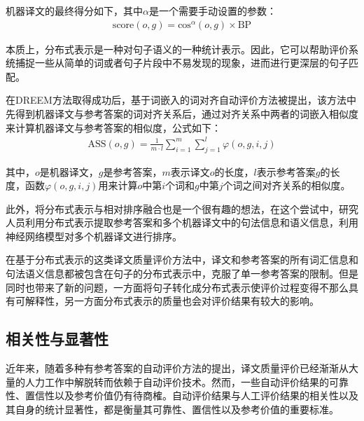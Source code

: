 \parinterval 机器译文的最终得分如下，其中$\alpha$是一个需要手动设置的参数：
\begin{eqnarray}
\textrm{score}(o,g) = \textrm{cos}{^\alpha }(o,g) \times \textrm{BP}
\label{eq:4-18}
\end{eqnarray}

\parinterval 本质上，分布式表示是一种对句子语义的一种统计表示。因此，它可以帮助评价系统捕捉一些从简单的词或者句子片段中不易发现的现象，进而进行更深层的句子匹配。

\parinterval 在DREEM方法取得成功后，基于词嵌入的词对齐自动评价方法被提出，该方法中先得到机器译文与参考答案的词对齐关系后，通过对齐关系中两者的词嵌入相似度来计算机器译文与参考答案的相似度，公式如下：
\begin{eqnarray}
\textrm{ASS}(o,g) = \frac{1}{{m \cdot l}}\sum\limits_{i = 1}^{m} {\sum\limits_{j = 1}^{l} {\varphi (o,g,i,j)} }
\label{eq:4-19}
\end{eqnarray}

\noindent 其中，$o$是机器译文，$g$是参考答案，$m$表示译文$o$的长度，$l$表示参考答案$g$的长度，函数$\varphi(o,g,i,j)$用来计算$o$中第$i$个词和$g$中第$j$个词之间对齐关系的相似度。

\parinterval 此外，将分布式表示与相对排序融合也是一个很有趣的想法，在这个尝试中，研究人员利用分布式表示提取参考答案和多个机器译文中的句法信息和语义信息，利用神经网络模型对多个机器译文进行排序。

\parinterval 在基于分布式表示的这类译文质量评价方法中，译文和参考答案的所有词汇信息和句法语义信息都被包含在句子的分布式表示中，克服了单一参考答案的限制。但是同时也带来了新的问题，一方面将句子转化成分布式表示使评价过程变得不那么具有可解释性，另一方面分布式表示的质量也会对评价结果有较大的影响。


\subsection{相关性与显著性}

\parinterval 近年来，随着多种有参考答案的自动评价方法的提出，译文质量评价已经渐渐从大量的人力工作中解脱转而依赖于自动评价技术。然而，一些自动评价结果的可靠性、置信性以及参考价值仍有待商榷。自动评价结果与人工评价结果的相关性以及其自身的统计显著性，都是衡量其可靠性、置信性以及参考价值的重要标准。

